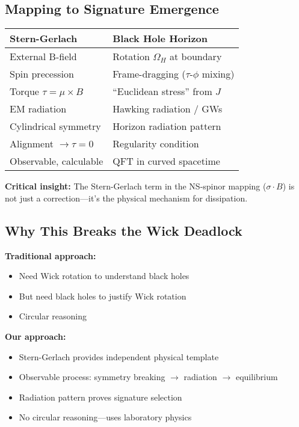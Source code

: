 \documentclass[11pt]{article}
\begin{document}
\subsection{Mapping to Signature Emergence}

\begin{center}
\begin{tabular}{|l|l|}
\hline
\textbf{Stern-Gerlach} & \textbf{Black Hole Horizon} \\
\hline
External B-field & Rotation $\Omega_H$ at boundary \\
Spin precession & Frame-dragging ($\tau$-$\phi$ mixing) \\
Torque $\tau = \mu \times B$ & ``Euclidean stress'' from $J$ \\
EM radiation & Hawking radiation / GWs \\
Cylindrical symmetry & Horizon radiation pattern \\
Alignment $\to \tau = 0$ & Regularity condition \\
Observable, calculable & QFT in curved spacetime \\
\hline
\end{tabular}
\end{center}

\textbf{Critical insight:} The Stern-Gerlach term in the NS-spinor mapping ($\sigma \cdot B$) is not just a correction---it's the physical mechanism for dissipation.

\subsection{Why This Breaks the Wick Deadlock}

\textbf{Traditional approach:}
\begin{itemize}
\item Need Wick rotation to understand black holes
\item But need black holes to justify Wick rotation
\item Circular reasoning
\end{itemize}

\textbf{Our approach:}
\begin{itemize}
\item Stern-Gerlach provides independent physical template
\item Observable process: symmetry breaking $\to$ radiation $\to$ equilibrium
\item Radiation pattern proves signature selection
\item No circular reasoning---uses laboratory physics
\end{itemize}
\end{document}

